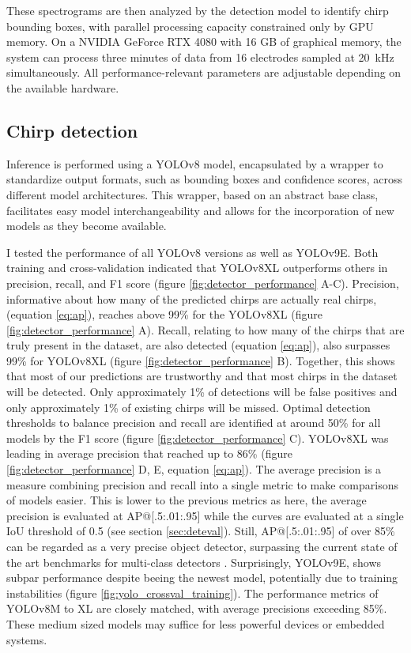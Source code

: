 These spectrograms are then analyzed by the detection model to identify chirp
bounding boxes, with parallel processing capacity constrained only by GPU
memory. On a NVIDIA GeForce RTX 4080 with 16 GB of graphical memory, the system
can process three minutes of data from 16 electrodes sampled at
\SI{20}{\kilo\hertz} simultaneously. All performance-relevant parameters are
adjustable depending on the available hardware.

\subsection{Chirp detection}

Inference is performed using a YOLOv8 model, encapsulated by a wrapper to
standardize output formats, such as bounding boxes and confidence scores,
across different model architectures. This wrapper, based on an abstract base
class, facilitates easy model interchangeability and allows for the
incorporation of new models as they become available.

I tested the performance of all YOLOv8 versions as well as YOLOv9E. Both
training and cross-validation indicated that YOLOv8XL outperforms others in
precision, recall, and F1 score (figure \ref{fig:detector_performance} A-C).
Precision, informative about how many of the  predicted chirps are actually
real chirps, (equation \ref{eq:ap}), reaches above 99\% for the YOLOv8XL
(figure \ref{fig:detector_performance} A). Recall, relating to how many of the
chirps that are truly present in the dataset, are also detected (equation
\ref{eq:ap}), also surpasses 99\% for YOLOv8XL (figure
\ref{fig:detector_performance} B). Together, this shows that most of our
predictions are trustworthy and that most chirps in the dataset will be
detected. Only approximately 1\% of detections will be false positives and only
approximately 1\% of existing chirps will be missed. Optimal detection
thresholds to balance precision and recall are identified at around 50\% for
all models by the F1 score (figure \ref{fig:detector_performance} C). YOLOv8XL
was leading in average precision that reached up to 86\% (figure
\ref{fig:detector_performance} D, E, equation \ref{eq:ap}). The average
precision is a measure combining precision and recall into a single metric to
make comparisons of models easier. This is lower to the previous metrics as
here, the average precision is evaluated at AP@[.5:.01:.95] while the curves
are evaluated at a single IoU threshold of 0.5 (see section \ref{sec:deteval}).
Still, AP@[.5:.01:.95] of over 85\% can be regarded as a very precise object
detector, surpassing the current state of the art benchmarks for multi-class
detectors \parencite{wangYOLOv9LearningWhat2024}. Surprisingly, YOLOv9E, shows
subpar performance despite beeing the newest model, potentially due to training
instabilities (figure \ref{fig:yolo_crossval_training}). The performance
metrics of YOLOv8M to XL are closely matched, with average precisions exceeding
85\%. These medium sized models may suffice for less powerful devices or
embedded systems.

